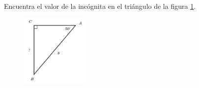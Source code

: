 Encuentra el valor de la incógnita en el triángulo de la figura \ref{fig:lados_functrig_05}.
\begin{figure}[H]
    \begin{center}
        \includegraphics[width=0.3\textwidth]{../images/lados_functrig_05.png}
    \end{center}
    \caption{}
    \label{fig:lados_functrig_05}
\end{figure}
